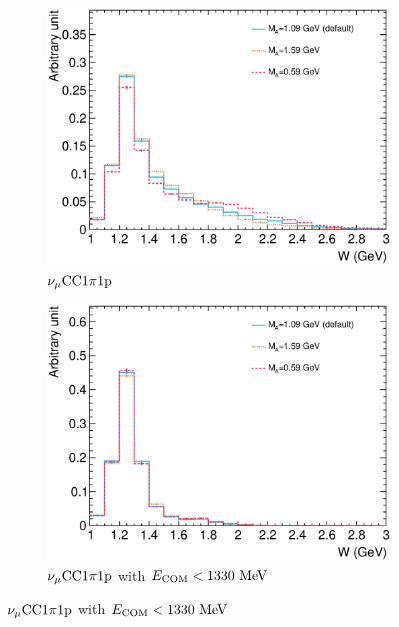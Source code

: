      \begin{figure}
     \centering
     \begin{subfigure}[b]{\dbfigwid\textwidth}
          \centering
          \includegraphics[width=\textwidth]{figures/COM/anorm-ma-minerva-600k-_wnucrest.eps}
          \caption{$\nu_{\mu}\textrm{CC}1\pi1\textrm{p}$}
          \label{subfig:ma-comp-minerva-w}
     \end{subfigure}
     \begin{subfigure}[b]{\dbfigwid\textwidth}
          \centering
          \includegraphics[width=\textwidth]{figures/COM/anorm-ma-minerva-600k-wcut_wnucrest.eps}
          \caption{$\nu_{\mu}\textrm{CC}1\pi1\textrm{p}$ with $E_{\textrm{COM}}<1330~\textrm{MeV}$}
          \label{subfig:ma-comp-minerva-wcut-w}
     \end{subfigure}

\end{figure}
